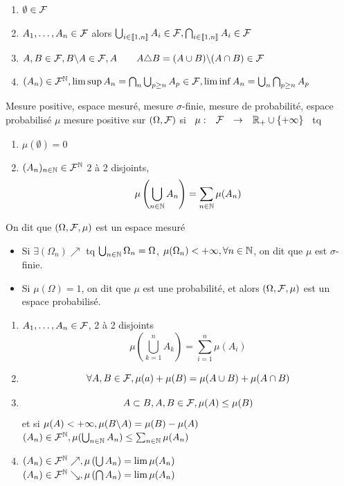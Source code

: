 \documentclass[]{report}
\begin{document}
\begin{prop}{}{}
    \begin{enumerate}[label=\alph*]
        \item $\emptyset\in \mathcal{F}$
        \item $A_1,\ldots,A_n\in \mathcal{F}$ alors $\bigcup_{i\in \llbracket 1,n\rrbracket} A_i \in \mathcal{F}, \bigcap_{i\in \llbracket 1,n \rrbracket} A_i \in \mathcal{F}$
        \item $A,B\in \mathcal{F}, B\backslash A\in \mathcal{F}, A \qquad A\triangle B=(A\cup B)\backslash (A\cap B)\in \mathcal{F}$
        \item $(A_n)\in \mathcal{F}^{\mathbb{N}},\limsup A_n=\bigcap_n \bigcup_{p\ge n}A_p\in \mathcal{F},\liminf A_n=\bigcup_n \bigcap_{p\ge n} A_p$
    \end{enumerate}
\end{prop}

\begin{df}{Mesure positive, espace mesuré, mesure $\sigma$-finie, mesure de probabilité, espace probabilisé}{}
    $\mu$ mesure positive sur $(\Omega,\mathcal{F})$ si $\begin{array}{ccccc} \mu : &  \mathcal{F} & \to & \mathbb{R}_+ \cup \{+\infty\} \end{array}$ tq
    \begin{enumerate}[label=\roman*]
        \item $\mu (\emptyset)=0$
        \item $(A_n)_{n\in\mathbb{N}}\in \mathcal{F}^{\mathbb{N}}$ 2 à 2 disjoints,
              \[ \mu \left( \bigcup_{n\in\mathbb{N}} A_n \right)=\sum_{n\in\mathbb{N}} \mu(A_n)\]
    \end{enumerate}
    On dit que $(\Omega,\mathcal{F},\mu)$ est un espace mesuré
    \begin{itemize}
        \item Si $\exists (\Omega_n)\nearrow$ tq $\bigcup_{n\in\mathbb{N}} \Omega_n=\Omega$, $\mu(\Omega_n)<+\infty,\forall n\in \mathbb{N}$, on dit que $\mu $ est $\sigma$-finie.
        \item Si $\mu(\Omega)=1$, on dit que $\mu$ est une probabilité, et alors $(\Omega,\mathcal{F},\mu)$ est un espace probabilisé.
    \end{itemize}
\end{df}

\begin{prop}{}{}
    \begin{enumerate}[label=\alph*]
        \item $A_1,\ldots,A_n\in \mathcal{F}$, 2 à 2 disjoints
              \[ \mu\left( \bigcup_{k=1}^n A_k\right)= \sum_{i=1}^n \mu (A_i)\]
        \item \[\forall A,B\in \mathcal{F},\mu(a)+\mu(B)=\mu(A\cup B)+ \mu(A\cap B)\]
        \item \[A\subset B, A,B\in \mathcal{F}, \mu(A)\le \mu(B)\]
              et si $\mu(A)<+\infty, \mu(B\backslash A)=\mu(B)-\mu (A)$\\
              $(A_n)\in \mathcal{F}^{\mathbb{N}},\mu(\bigcup_{n\in\mathbb{N}} A_n)\le \sum_{{n\in\mathbb{N}}} \mu(A_n)$
        \item $(A_n)\in \mathcal{F}^{\mathbb{N}} \nearrow,\mu\left(\bigcup A_n\right)=\lim \mu(A_n)$\\
              $(A_n)\in \mathcal{F}^{\mathbb{N}} \searrow,\mu\left(\bigcap A_n\right)=\lim \mu(A_n)$
    \end{enumerate}
\end{prop}
\end{document}
